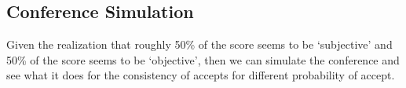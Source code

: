 \hypertarget{conference-simulation}{%
\subsection{Conference Simulation}\label{conference-simulation}}

\begin{flushright}
\end{flushright}

Given the realization that roughly 50\% of the score seems to be
`subjective' and 50\% of the score seems to be `objective', then we can
simulate the conference and see what it does for the consistency of
accepts for different probability of accept.

\begin{Shaded}
\begin{Highlighting}[]
\end{Highlighting}
\end{Shaded}

\begin{Shaded}
\begin{Highlighting}[]
\OperatorTok{=} 
\OperatorTok{=} 
\end{Highlighting}
\end{Shaded}


